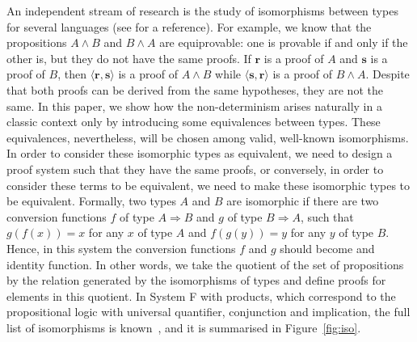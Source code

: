 \documentclass[final,copyright,creativecommons]{eptcs}
\newcommand{\ve}[1]{\ensuremath{\mathrm{\textbf{#1}}}}
\theoremstyle{definition}
\begin{document}
An independent stream of research is the study of isomorphisms between types for several languages (see \cite{DiCosmo95} for a reference).
For example, we know that the propositions $A \wedge B$ and $B \wedge A$ are equiprovable: one is provable if and only if the other is, but they do not have the same proofs. If $\ve r$ is a proof of $A$ and $\ve s$ is a proof of $B$, then $\langle\ve r,\ve s\rangle$ is a proof of $A\wedge B$ while $\langle\ve s,\ve r\rangle$ is a proof of $B\wedge A$. Despite that both proofs can be derived from the same hypotheses, they are not the same.
In this paper, we show how the non-determinism arises naturally in a classic context only by introducing some equivalences between types. These equivalences, nevertheless, will be chosen among valid, well-known isomorphisms.
In order to consider these isomorphic types as equivalent, we need to design a proof system such that they have the same proofs, or conversely, in order to consider these terms to be equivalent, we need to make these isomorphic types to be equivalent. Formally, two types $A$ and $B$ are isomorphic if there are two conversion functions $f$ of type $A\Rightarrow B$ and $g$ of type $B\Rightarrow A$, such that $g(f(x))=x$ for any $x$ of type $A$ and $f(g(y))=y$ for any $y$ of type $B$.
Hence, in this system the conversion functions $f$ and $g$ should become and identity function. In other words, we take the quotient of the set of propositions by the relation generated by the isomorphisms of types and define proofs for elements in this quotient. In System F with products, which correspond to the propositional logic with universal quantifier, conjunction and implication, the full list of isomorphisms is known~\cite{DiCosmo95}, and it is summarised in Figure~\ref{fig:iso}.
\end{document}
